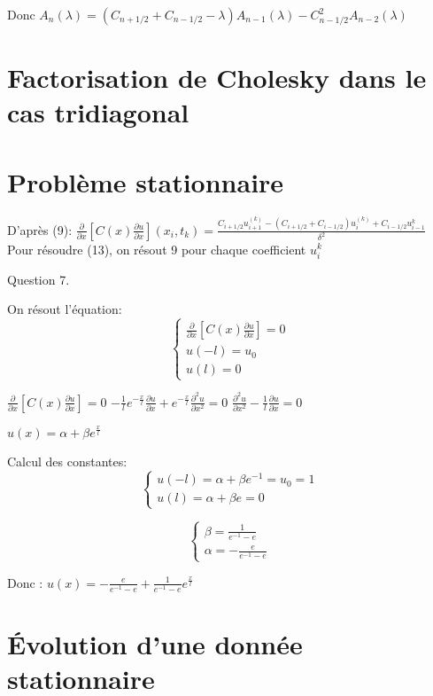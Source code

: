 \documentclass[a4paper,11pt]{article}
\theoremstyle{nonumberplain}
\begin{document}
Donc $A_n(\lambda) = (C_{n + 1/2} + C_{n - 1/2} - \lambda) A_{n-1}(\lambda) -C_{n - 1/2}^{2} A_{n-2}(\lambda) $






\section{Factorisation de Cholesky dans le cas tridiagonal}

\section{Problème stationnaire}


D'après (9):
$ \frac{\partial}{\partial x}[C(x)\frac{\partial u}{\partial x}](x_i, t_k) = \frac{C_{i+1/2}u_{i+1}^{(k)} - (C_{i+1/2} + C_{i-1/2})u_i^{(k)}+C_{i-1/2}u_{i-1}^{k}}{\delta^{2}} $
Pour résoudre (13), on résout 9 pour chaque coefficient $u_i^{k}$

Question 7.

On résout l'équation:
$$\left\{
\begin{array}{ll}
  \frac{\partial}{\partial x}[C(x)\frac{\partial u}{\partial x}] = 0 \\
  u(-l) = u_0 \\
  u(l) = 0
  \end{array}
\right.
$$

$  \frac{\partial}{\partial x}[C(x)\frac{\partial u}{\partial x}] = 0 $
$  -\frac{1}{l} e^{-\frac{x}{l}}\frac{\partial u}{\partial x} + e^{-\frac{x}{l}} \frac{\partial^2 u }{\partial x^2} = 0 $
$ \frac{\partial^2 u}{\partial x^2} - \frac{1}{l} \frac{\partial u}{\partial x} = 0$

$u(x) = \alpha + \beta e^{\frac{x}{l}} $

Calcul des constantes:
$$\left\{
  \begin{array}{ll}
    u(-l) = \alpha + \beta e^{-1} = u_0 = 1 \\
    u(l) = \alpha + \beta e = 0
  \end{array}
\right.
$$

$$\left\{
  \begin{array}{ll}
    \beta = \frac{1}{e^{-1} - e} \\
    \alpha = -\frac{e}{e^{-1} - e}
  \end{array}
\right.
$$

Donc :
$u(x) = -\frac{e}{e^{-1} - e} + \frac{1}{e^{-1} - e} e^{\frac{x}{l}} $

\section{\'{E}volution d'une donnée stationnaire}
\end{document}
